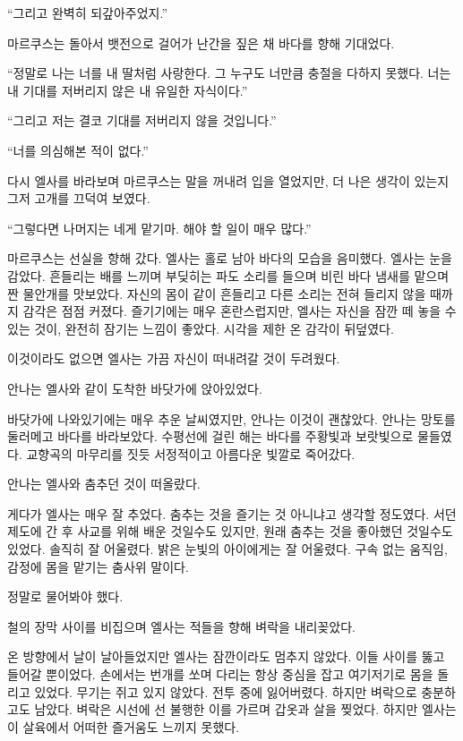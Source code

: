 ``그리고 완벽히 되갚아주었지.'' %

마르쿠스는 돌아서 뱃전으로 걸어가 난간을 짚은 채 바다를 향해 기대었다.

``정말로 나는 너를 내 딸처럼 사랑한다. 그 누구도 너만큼 충절을 다하지 못했다. 너는 내 기대를 저버리지 않은 내 유일한 자식이다.''

``그리고 저는 결코 기대를 저버리지 않을 것입니다.''

`` 너를 의심해본 적이 없다.''

다시 엘사를 바라보며 마르쿠스는 말을 꺼내려 입을 열었지만, 더 나은 생각이 있는지 그저 고개를 끄덕여 보였다.

``그렇다면 나머지는 네게 맡기마. 해야 할 일이 매우 많다.''

마르쿠스는 선실을 향해 갔다. 엘사는 홀로 남아 바다의 모습을 음미했다. 엘사는 눈을 감았다. 흔들리는 배를 느끼며 부딪히는 파도 소리를 들으며 비린 바다 냄새를 맡으며 짠 물안개를 맛보았다. 자신의 몸이 같이 흔들리고 다른 소리는 전혀 들리지 않을 때까지 감각은 점점 커졌다. 즐기기에는 매우 혼란스럽지만, 엘사는 자신을 잠깐 떼 놓을 수 있는 것이, 완전히 잠기는 느낌이 좋았다. 시각을 제한 온 감각이 뒤덮였다. %

이것이라도 없으면 엘사는 가끔 자신이 떠내려갈 것이 두려웠다.

\textbreak

안나는 엘사와 같이 도착한 바닷가에 앉아있었다.

바닷가에 나와있기에는 매우 추운 날씨였지만, 안나는 이것이 괜찮았다. 안나는 망토를 둘러메고 바다를 바라보았다. 수평선에 걸린 해는 바다를 주황빛과 보랏빛으로 물들였다. 교향곡의 마무리를 짓듯 서정적이고 아름다운 빛깔로 죽어갔다.

안나는 엘사와 춤추던 것이 떠올랐다.

게다가 엘사는 매우 잘 추었다. 춤추는 것을 즐기는 것 아니냐고 생각할 정도였다. 서던 제도에 간 후 사교를 위해 배운 것일수도 있지만, 원래 춤추는 것을 좋아했던 것일수도 있었다. 솔직히 잘 어울렸다. 밝은 눈빛의 아이에게는 잘 어울렸다. 구속 없는 움직임, 감정에 몸을 맡기는 춤사위 말이다.

정말로 물어봐야 했다.

\textbreak

철의 장막 사이를 비집으며 엘사는 적들을 향해 벼락을 내리꽂았다.

온 방향에서 날이 날아들었지만 엘사는 잠깐이라도 멈추지 않았다. 이들 사이를 뚫고 들어갈 뿐이었다. 손에서는 번개를 쏘며 다리는 항상 중심을 잡고 여기저기로 몸을 돌리고 있었다. 무기는 쥐고 있지 않았다. 전투 중에 잃어버렸다. 하지만 벼락으로 충분하고도 남았다. 벼락은 시선에 선 불행한 이를 가르며 갑옷과 살을 찢었다. 하지만 엘사는 이 살육에서 어떠한 즐거움도 느끼지 못했다.

